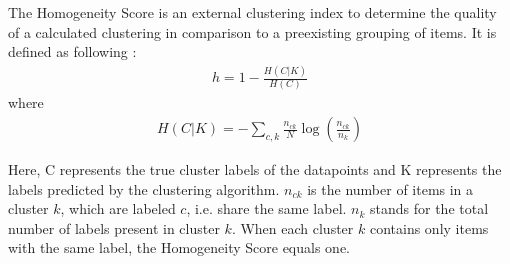 The Homogeneity Score is an external clustering index to determine the quality of a calculated clustering in comparison to a preexisting grouping of items.
It is defined as following \cite{rosenberg2007v}:\\

\begin{align}
    h = 1 - \frac{H(C|K)}{H(C)}
\end{align}
where
\begin{align}
    H(C|K) = - \sum_{c,k} \frac{n_{ck}}{N}\log\left(\frac{n_{ck}}{n_k}\right)
\end{align}

Here, C represents the true cluster labels of the datapoints and K represents the labels predicted by the clustering algorithm. $n_{ck}$ is the number of items in a cluster $k$, which are labeled $c$, i.e. share the same label. $n_k$ stands for the total number of labels present in cluster $k$.
When each cluster $k$ contains only items with the same label, the Homogeneity Score equals one.